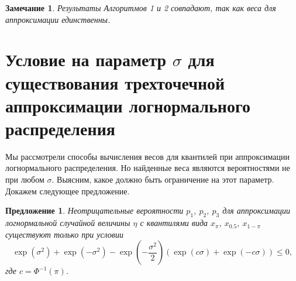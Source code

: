 \documentclass[specialist, substylefile = spbu.rtx,
subf,href,colorlinks=true, 12pt]{disser}
\newtheorem{proposition}[theorem]{Предложение}
\newtheorem{zam}{Замечание}
\begin{document}
	\begin{zam}
		Результаты Алгоритмов 1 и 2 совпадают, так как веса для аппроксимации единственны.
	\end{zam}
	
	
	\section{Условие на параметр $\sigma$ для существования трехточечной аппроксимации логнормального распределения }
	
	Мы рассмотрели способы вычисления весов для квантилей при аппроксимации логнормального распределения. Но найденные веса являются вероятностями не при любом $\sigma$. Выясним, какое должно быть ограничение на этот параметр. Докажем следующее предложение.
	\begin{proposition}\label{pr5}
		Неотрицательные вероятности $p_{1}$, $p_{2}$, $p_{3}$ для аппроксимации логнормальной случайной величины $\eta$ с квантилями вида $x_{\pi}$, $x_{0.5}$, $x_{1-\pi}$ существуют только при условии
		\begin{equation}
			\exp(\sigma^{2})+\exp(-\sigma^{2})-\exp\left( -\dfrac{\sigma^{2}}{2}\right) (\exp(c\sigma)+\exp(-c\sigma))\leq 0, \label{14}
		\end{equation}
		где $c = \Phi^{-1}(\pi)$.
	\end{proposition}
\end{document}
